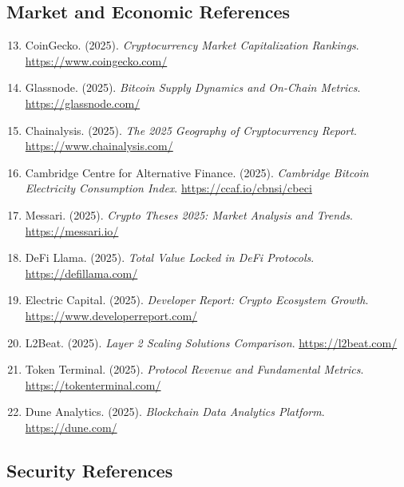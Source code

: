 \documentclass[11pt,a4paper]{article}
\begin{document}
\subsection*{Market and Economic References}

\begin{enumerate}
    \setcounter{enumi}{12}

    \item CoinGecko. (2025). \textit{Cryptocurrency Market Capitalization Rankings}. \url{https://www.coingecko.com/}

    \item Glassnode. (2025). \textit{Bitcoin Supply Dynamics and On-Chain Metrics}. \url{https://glassnode.com/}

    \item Chainalysis. (2025). \textit{The 2025 Geography of Cryptocurrency Report}. \url{https://www.chainalysis.com/}

    \item Cambridge Centre for Alternative Finance. (2025). \textit{Cambridge Bitcoin Electricity Consumption Index}. \url{https://ccaf.io/cbnsi/cbeci}

    \item Messari. (2025). \textit{Crypto Theses 2025: Market Analysis and Trends}. \url{https://messari.io/}

    \item DeFi Llama. (2025). \textit{Total Value Locked in DeFi Protocols}. \url{https://defillama.com/}

    \item Electric Capital. (2025). \textit{Developer Report: Crypto Ecosystem Growth}. \url{https://www.developerreport.com/}

    \item L2Beat. (2025). \textit{Layer 2 Scaling Solutions Comparison}. \url{https://l2beat.com/}

    \item Token Terminal. (2025). \textit{Protocol Revenue and Fundamental Metrics}. \url{https://tokenterminal.com/}

    \item Dune Analytics. (2025). \textit{Blockchain Data Analytics Platform}. \url{https://dune.com/}
\end{enumerate}

\subsection*{Security References}
\end{document}
